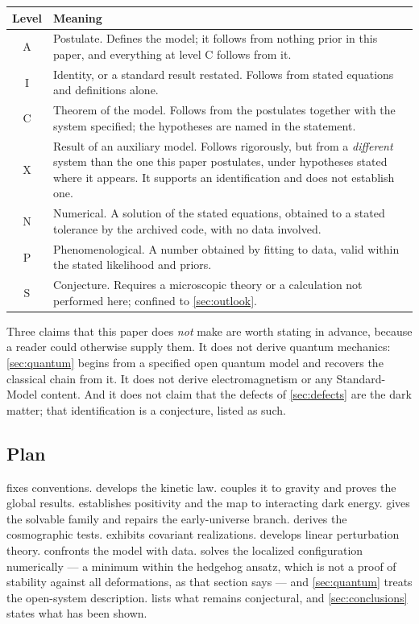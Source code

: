 \begin{center}
\begin{tabular}{cL{0.75\textwidth}}
  \toprule
  Level & Meaning \\
  \midrule
  A & Postulate. Defines the model; it follows from nothing prior in this
      paper, and everything at level C follows from it. \\
  I & Identity, or a standard result restated. Follows from stated equations
      and definitions alone. \\
  C & Theorem of the model. Follows from the postulates together with the
      system specified; the hypotheses are named in the statement. \\
  X & Result of an auxiliary model. Follows rigorously, but from a
      \emph{different} system than the one this paper postulates, under
      hypotheses stated where it appears. It supports an identification and
      does not establish one. \\
  N & Numerical. A solution of the stated equations, obtained to a stated
      tolerance by the archived code, with no data involved. \\
  P & Phenomenological. A number obtained by fitting to data, valid within the
      stated likelihood and priors. \\
  S & Conjecture. Requires a microscopic theory or a calculation not performed
      here; confined to \cref{sec:outlook}. \\
  \bottomrule
\end{tabular}
\end{center}

Three claims that this paper does \emph{not} make are worth stating in advance,
because a reader could otherwise supply them. It does not derive quantum
mechanics: \cref{sec:quantum} begins from a specified open quantum model and
recovers the classical chain from it. It does not derive electromagnetism or
any Standard-Model content. And it does not claim that the defects of
\cref{sec:defects} are the dark matter; that identification is a conjecture,
listed as such.

\subsection{Plan}\label{sec:intro-plan}

 fixes conventions.
 develops the kinetic law.
 couples it to gravity and proves the global
results.  establishes positivity and the map to
interacting dark energy.  gives the solvable family
and repairs the early-universe branch.  derives the
cosmographic tests.  exhibits covariant realizations.
 develops linear perturbation theory.
 confronts the model with data.
 solves the localized configuration numerically --- a
minimum within the hedgehog ansatz, which is not a proof of stability against
all deformations, as that section says --- and \cref{sec:quantum} treats the
open-system description.  lists what remains conjectural, and
\cref{sec:conclusions} states what has been shown.
